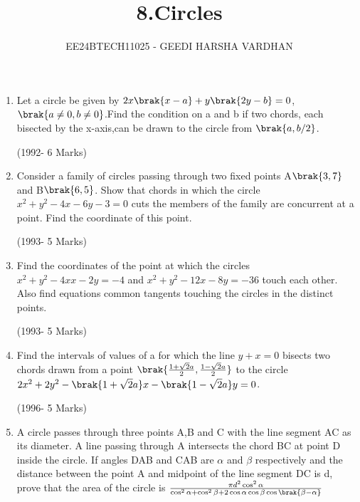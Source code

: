 \documentclass[journal,12pt,twocolumn]{IEEEtran}
\theoremstyle{remark}
\begin{document}

\vspace{3cm}

\title{8.Circles }
\author{EE24BTECH11025 - GEEDI HARSHA VARDHAN }
\maketitle
\newpage
\bigskip

\renewcommand{\thefigure}{\theenumi}
\renewcommand{\thetable}{\theenumi}

\begin{enumerate}

\item Let a circle be given by $2x\brak{x-a}+y\brak{2y-b}=0$,$\brak{a\neq0,b\neq0}$.Find the condition on a and b if two chords, each bisected by the x-axis,can be drawn to the circle from $\brak{a,b/2}$.                         

\hfill(1992- 6 Marks)\\




\item Consider a family of circles passing through two fixed points A$\brak{3,7}$ and B$\brak{6,5}$. Show that chords in which the circle $x^2+y^2-4x-6y-3=0$ cuts the members of the family are concurrent at a point. Find the coordinate of this point.
	        
\hfill(1993- 5 Marks)\\





\item Find the coordinates of the point at which the circles $x^2+y^2-4xx-2y=-4$ and $x^2+y^2-12x-8y=-36$ touch each other. Also find equations common tangents touching the circles in the distinct points.                        

\hfill(1993- 5 Marks)\\


\item Find the intervals of values of a for which the line $y+x=0$ bisects two chords drawn from a point $\brak {\frac{1+\sqrt{2}a}{2},\frac{1-\sqrt{2}a}{2}}$ to the circle $2x^2+2y^2-\brak{1+\sqrt{2}a}x-\brak{1-\sqrt{2}a}y=0$.  

\hfill(1996- 5 Marks)\\





\item A circle passes through three points A,B and C with the line segment AC as its diameter. A line passing through A intersects the chord BC at point D inside the circle. If angles DAB and CAB are $\alpha$ and $\beta$ respectively and the distance between the point A and midpoint of the line segment DC is d, prove that the area of the circle is $\frac{\pi d^2 \cos^2{\alpha} }{\cos^2{\alpha}+\cos^2{\beta}+ 2\cos{\alpha} \cos{\beta} \cos{\brak{\beta-\alpha}}}$                


\end{enumerate}
\end{document}
